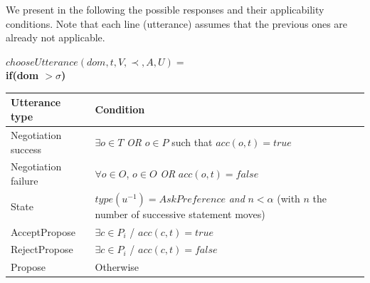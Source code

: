 \documentclass{llncs}
\begin{document}
		We present in the following the possible responses and their applicability conditions. Note that each line (utterance)  assumes that the previous ones are already not applicable.
		
		$ chooseUtterance(dom, t, V, \prec, A, U) = $ \\
		
		
		\textbf{if(\textbf{dom  $>\sigma$})} 
		\begin{table}
		\centering
	
		\begin{tabular}{|p{3cm}|p{9cm}|}
			\hline
			\textbf{Utterance type} & Condition \\
			\hline
			Negotiation success & $\exists o \in T$   \emph{OR} $o \in P$ such that  $acc(o,t) = true$ \\
			\hline
			Negotiation failure & $ \forall o \in O$,  $o \in O$  \emph{OR} $acc(o,t) = false$\\
			\hline
			State & $type(u^{-1}) = AskPreference$  \textit{ and }
			$n < \alpha$ (with $n$ the number of successive statement moves)\\
			\hline
			AcceptPropose & $\exists c \in P_i$ / $acc(c,t)= true$ \\
			\hline
			RejectPropose & $\exists c \in P_i$ / $acc(c,t)= false$ \\
			\hline
			Propose & Otherwise  \\
			
			\hline
		\end{tabular}
		\end{table}
\end{document}
